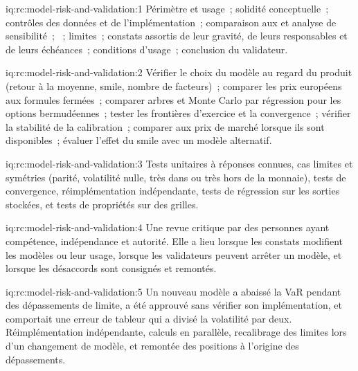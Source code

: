 \begin{solution}{iq:rc:model-risk-and-validation:1}
Périmètre et usage~; solidité conceptuelle~; contrôles des données et de l'implémentation~; comparaison aux  et
analyse de sensibilité~; ~; limites~; constats assortis de leur gravité, de leurs responsables
et de leurs échéances~; conditions d'usage~; conclusion du validateur.
\end{solution}

\begin{solution}{iq:rc:model-risk-and-validation:2}
Vérifier le choix du modèle au regard du produit (retour à la moyenne, smile, nombre de facteurs)~; comparer
les prix européens aux formules fermées~; comparer arbres et Monte Carlo par régression pour les options bermudéennes~; tester
les frontières d'exercice et la convergence~; vérifier la stabilité de la calibration~; comparer aux prix de marché lorsque
ils sont disponibles~; évaluer l'effet du smile avec un modèle alternatif.
\end{solution}

\begin{solution}{iq:rc:model-risk-and-validation:3}
Tests unitaires à réponses connues, cas limites et symétries (parité, volatilité nulle, très dans ou très hors de la
monnaie), tests de convergence, réimplémentation indépendante, tests de régression sur les sorties stockées, et
tests de propriétés sur des grilles.
\end{solution}

\begin{solution}{iq:rc:model-risk-and-validation:4}
Une revue critique par des personnes ayant compétence, indépendance et autorité. Elle a lieu lorsque les constats
modifient les modèles ou leur usage, lorsque les validateurs peuvent arrêter un modèle, et lorsque les désaccords sont
consignés et remontés.
\end{solution}

\begin{solution}{iq:rc:model-risk-and-validation:5}
Un nouveau modèle a abaissé la VaR pendant des dépassements de limite, a été approuvé sans vérifier son implémentation,
et comportait une erreur de tableur qui a divisé la volatilité par deux. Réimplémentation indépendante, calculs en parallèle,
recalibrage des limites lors d'un changement de modèle, et remontée des positions à l'origine des dépassements.
\end{solution}

